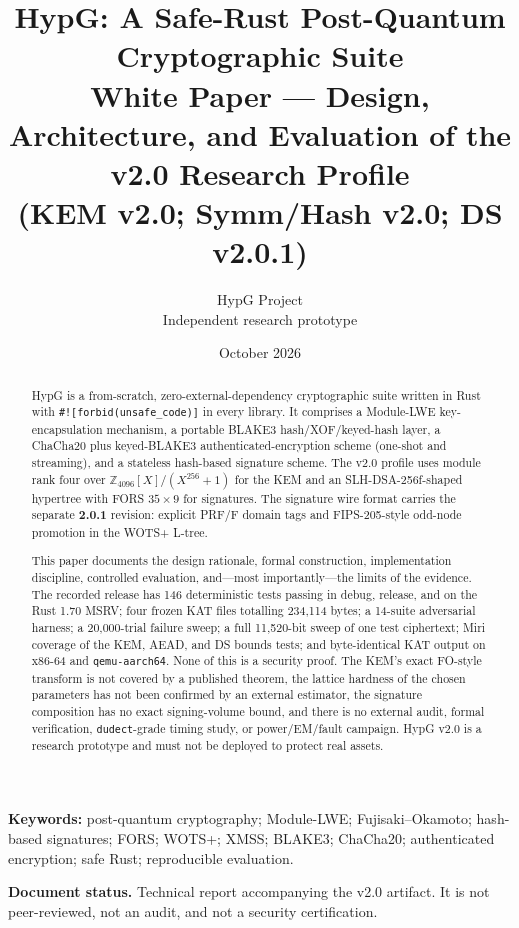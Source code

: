 \documentclass[11pt,a4paper]{article}
\title{\textbf{HypG: A Safe-Rust Post-Quantum Cryptographic Suite}\\[0.5ex]
\large White Paper --- Design, Architecture, and Evaluation of the v2.0 Research Profile\\[0.3ex]
\normalsize (KEM v2.0; Symm/Hash v2.0; DS v2.0.1)}
\author{HypG Project\\
\small Independent research prototype}
\date{October 2026}
\theoremstyle{plain}
\theoremstyle{definition}
\theoremstyle{remark}
\newcommand{\Z}{\mathbb{Z}}
\begin{document}
\maketitle

\begin{abstract}
HypG is a from-scratch, zero-external-dependency cryptographic suite
written in Rust with \texttt{\#![forbid(unsafe\_code)]} in every
library.  It comprises a Module-LWE key-encapsulation mechanism, a
portable BLAKE3 hash/XOF/keyed-hash layer, a ChaCha20 plus keyed-BLAKE3
authenticated-encryption scheme (one-shot and streaming), and a
stateless hash-based signature scheme.  The v2.0 profile uses module
rank four over $\Z_{4096}[X]/(X^{256}+1)$ for the KEM and an
SLH-DSA-256f-shaped hypertree with FORS $35\times 9$ for signatures.
The signature wire format carries the separate \textbf{2.0.1}
revision: explicit PRF/F domain tags and FIPS-205-style odd-node
promotion in the WOTS+ L-tree.

This paper documents the design rationale, formal construction,
implementation discipline, controlled evaluation, and---most
importantly---the limits of the evidence.  The recorded release has 146
deterministic tests passing in debug, release, and on the Rust 1.70
MSRV; four frozen KAT files totalling 234,114 bytes; a 14-suite
adversarial harness; a 20,000-trial failure sweep; a full 11,520-bit
sweep of one test ciphertext; Miri coverage of the KEM, AEAD, and DS bounds
tests; and byte-identical KAT output on x86-64 and
\texttt{qemu-aarch64}.  None of this is a security proof.  The KEM's
exact FO-style transform is not covered by a published theorem, the
lattice hardness of the chosen parameters has not been confirmed by an
external estimator, the signature composition has no exact
signing-volume bound, and there is no external audit, formal
verification, \texttt{dudect}-grade timing study, or power/EM/fault
campaign.  HypG v2.0 is a research prototype and must not be deployed
to protect real assets.
\end{abstract}

\noindent\textbf{Keywords:} post-quantum cryptography; Module-LWE;
Fujisaki--Okamoto; hash-based signatures; FORS; WOTS+; XMSS; BLAKE3;
ChaCha20; authenticated encryption; safe Rust; reproducible evaluation.

\medskip
\noindent\textbf{Document status.} Technical report accompanying the
v2.0 artifact.  It is not peer-reviewed, not an audit, and not a
security certification.

\tableofcontents
\newpage
\end{document}
